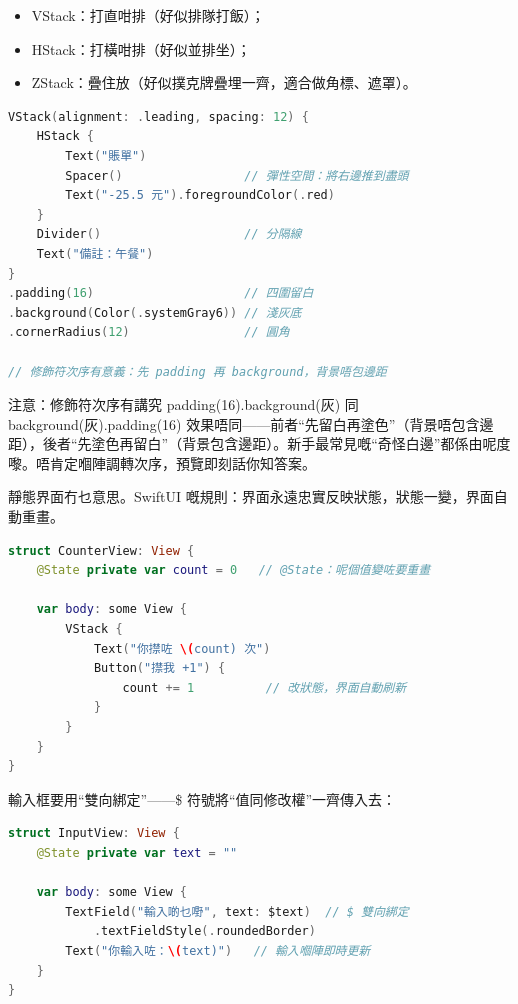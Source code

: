 \begin{itemize}
  \item VStack：打直咁排（好似排隊打飯）；
  \item HStack：打橫咁排（好似並排坐）；
  \item ZStack：疊住放（好似撲克牌疊埋一齊，適合做角標、遮罩）。
\end{itemize}

\begin{lstlisting}[language=Swift]
VStack(alignment: .leading, spacing: 12) {
    HStack {
        Text("賬單")
        Spacer()                 // 彈性空間：將右邊推到盡頭
        Text("-25.5 元").foregroundColor(.red)
    }
    Divider()                    // 分隔線
    Text("備註：午餐")
}
.padding(16)                     // 四圍留白
.background(Color(.systemGray6)) // 淺灰底
.cornerRadius(12)                // 圓角

// 修飾符次序有意義：先 padding 再 background，背景唔包邊距
\end{lstlisting}

\begin{tcbwarn}{注意：修飾符次序有講究}
padding(16).background(灰) 同 background(灰).padding(16) 效果唔同——前者“先留白再塗色”（背景唔包含邊距），後者“先塗色再留白”（背景包含邊距）。新手最常見嘅“奇怪白邊”都係由呢度嚟。唔肯定嗰陣調轉次序，預覽即刻話你知答案。

\end{tcbwarn}


靜態界面冇乜意思。SwiftUI 嘅規則：界面永遠忠實反映狀態，狀態一變，界面自動重畫。

\begin{lstlisting}[language=Swift]
struct CounterView: View {
    @State private var count = 0   // @State：呢個值變咗要重畫

    var body: some View {
        VStack {
            Text("你㩒咗 \(count) 次")
            Button("㩒我 +1") {
                count += 1          // 改狀態，界面自動刷新
            }
        }
    }
}
\end{lstlisting}

輸入框要用“雙向綁定”——\$ 符號將“值同修改權”一齊傳入去：

\begin{lstlisting}[language=Swift]
struct InputView: View {
    @State private var text = ""

    var body: some View {
        TextField("輸入啲乜嘢", text: $text)  // $ 雙向綁定
            .textFieldStyle(.roundedBorder)
        Text("你輸入咗：\(text)")   // 輸入嗰陣即時更新
    }
}
\end{lstlisting}

